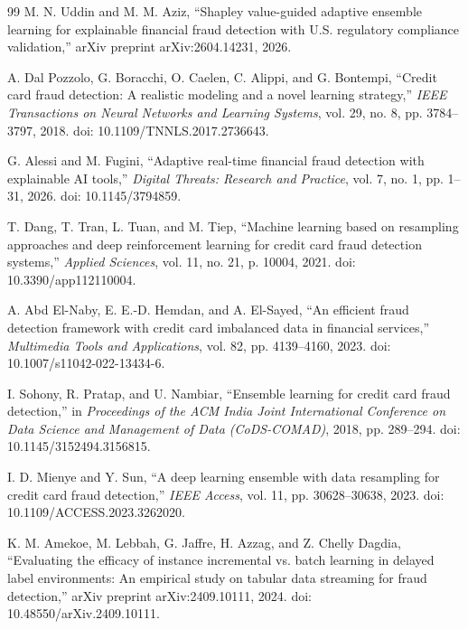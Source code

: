\begin{thebibliography}{99}
M. N. Uddin and M. M. Aziz, ``Shapley value-guided adaptive ensemble learning for explainable financial fraud detection with U.S. regulatory compliance validation,'' arXiv preprint arXiv:2604.14231, 2026.

A. Dal Pozzolo, G. Boracchi, O. Caelen, C. Alippi, and G. Bontempi, ``Credit card fraud detection: A realistic modeling and a novel learning strategy,'' \textit{IEEE Transactions on Neural Networks and Learning Systems}, vol. 29, no. 8, pp. 3784--3797, 2018. doi: 10.1109/TNNLS.2017.2736643.

G. Alessi and M. Fugini, ``Adaptive real-time financial fraud detection with explainable AI tools,'' \textit{Digital Threats: Research and Practice}, vol. 7, no. 1, pp. 1--31, 2026. doi: 10.1145/3794859.

T. Dang, T. Tran, L. Tuan, and M. Tiep, ``Machine learning based on resampling approaches and deep reinforcement learning for credit card fraud detection systems,'' \textit{Applied Sciences}, vol. 11, no. 21, p. 10004, 2021. doi: 10.3390/app112110004.

A. Abd El-Naby, E. E.-D. Hemdan, and A. El-Sayed, ``An efficient fraud detection framework with credit card imbalanced data in financial services,'' \textit{Multimedia Tools and Applications}, vol. 82, pp. 4139--4160, 2023. doi: 10.1007/s11042-022-13434-6.

I. Sohony, R. Pratap, and U. Nambiar, ``Ensemble learning for credit card fraud detection,'' in \textit{Proceedings of the ACM India Joint International Conference on Data Science and Management of Data (CoDS-COMAD)}, 2018, pp. 289--294. doi: 10.1145/3152494.3156815.

I. D. Mienye and Y. Sun, ``A deep learning ensemble with data resampling for credit card fraud detection,'' \textit{IEEE Access}, vol. 11, pp. 30628--30638, 2023. doi: 10.1109/ACCESS.2023.3262020.

K. M. Amekoe, M. Lebbah, G. Jaffre, H. Azzag, and Z. Chelly Dagdia, ``Evaluating the efficacy of instance incremental vs. batch learning in delayed label environments: An empirical study on tabular data streaming for fraud detection,'' arXiv preprint arXiv:2409.10111, 2024. doi: 10.48550/arXiv.2409.10111.


\end{thebibliography}
